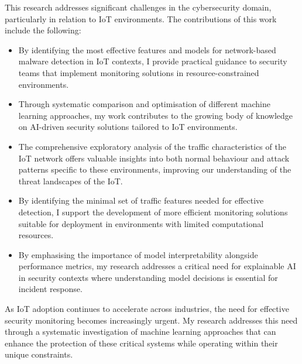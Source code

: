 This research addresses significant challenges in the cybersecurity domain, particularly in relation to IoT environments. The contributions of this work include the following:

\begin{itemize}
    \item By identifying the most effective features and models for network-based malware detection in IoT contexts, I provide practical guidance to security teams that implement monitoring solutions in resource-constrained environments.
    
    \item  Through systematic comparison and optimisation of different machine learning approaches, my work contributes to the growing body of knowledge on AI-driven security solutions tailored to IoT environments.
    
    \item The comprehensive exploratory analysis of the traffic characteristics of the IoT network offers valuable insights into both normal behaviour and attack patterns specific to these environments, improving our understanding of the threat landscapes of the IoT.
    
    \item By identifying the minimal set of traffic features needed for effective detection, I support the development of more efficient monitoring solutions suitable for deployment in environments with limited computational resources.
    
    \item By emphasising the importance of model interpretability alongside performance metrics, my research addresses a critical need for explainable AI in security contexts where understanding model decisions is essential for incident response.
\end{itemize}

As IoT adoption continues to accelerate across industries, the need for effective security monitoring becomes increasingly urgent. My research addresses this need through a systematic investigation of machine learning approaches that can enhance the protection of these critical systems while operating within their unique constraints.